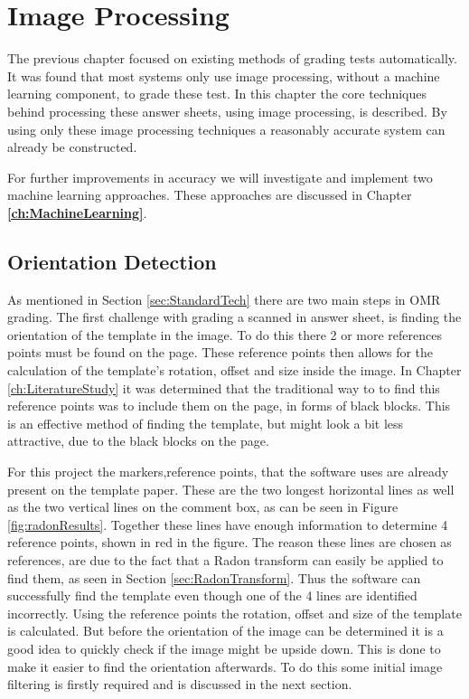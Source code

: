 \chapter{Image Processing}
\label{ch:ImageProcessing}
\graphicspath{{Chapter3/Chapter3Figures/}}
The previous chapter focused on existing methods of grading tests automatically. It was found that most systems only use image processing, without a machine learning component, to grade these test. In this chapter the core techniques behind processing these answer sheets, using image processing, is described. By using only these image processing techniques a reasonably accurate system can already be constructed.

For further improvements in accuracy we will investigate and implement two machine learning approaches. These approaches are discussed in Chapter \textbf{\ref{ch:MachineLearning}}.

\section{Orientation Detection}
\label{sec:orientDetect}
As mentioned in Section \ref{sec:StandardTech} there are two main steps in OMR grading. The first challenge with grading a scanned in answer sheet, is finding the orientation of the template in the image. To do this there 2 or more references points must be found on the page. These reference points then allows for the calculation of the template's rotation, offset and size inside the image. In Chapter \ref{ch:LiteratureStudy} it was determined that the traditional way to to find this reference points was to include them on the page, in forms of black blocks. This is an effective method of finding the template, but might look a bit less attractive, due to the black blocks on the page.

For this project the markers,reference points, that the software uses are already present on the template paper. These are the two longest horizontal lines as well as the two vertical lines on the comment box, as can be seen in Figure \ref{fig:radonResults}. Together these lines have enough information to determine 4 reference points, shown in red in the figure. The reason these lines are chosen as references, are due to the fact that a Radon transform can easily be applied to find them, as seen in Section \ref{sec:RadonTransform}. Thus the software can successfully find the template even though one of the 4 lines are identified incorrectly. Using the reference points the rotation, offset and size of the template is calculated. But before the orientation of the image can be determined it is a good idea to quickly check if the image might be upside down. This is done to make it easier to find the orientation afterwards. To do this some initial image filtering is firstly required and is discussed in the next section.

